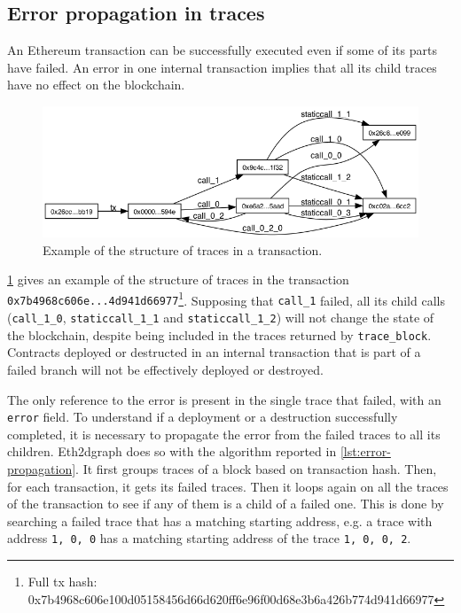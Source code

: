 \subsection{Error propagation in traces}

An Ethereum transaction can be successfully executed even if some of its parts have failed. An error in one internal transaction implies that all its child traces have no effect on the blockchain. 

\begin{figure}[!ht]
  \centering
  \includegraphics[width=1\textwidth]{Figures/methods/traces.png}
  \caption{Example of the structure of traces in a transaction.}
  \label{fig:traces}
\end{figure}

\cref{fig:traces} gives an example of the structure of traces in the transaction {\tt 0x7b4968c606e...4d941d66977}\footnote{Full tx hash: 0x7b4968c606e100d05158456d66d620ff6e96f00d68e3b6a426b774d941d66977}. Supposing that {\tt call\_1} failed, all its child calls ({\tt call\_1\_0}, {\tt staticcall\_1\_1} and {\tt staticcall\_1\_2}) will not change the state of the blockchain, despite being included in the traces returned by {\tt trace\_block}. Contracts deployed or destructed in an internal transaction that is part of a failed branch will not be effectively deployed or destroyed. 

The only reference to the error is present in the single trace that failed, with an {\tt error} field. To understand if a deployment or a destruction successfully completed, it is necessary to propagate the error from the failed traces to all its children. Eth2dgraph does so with the algorithm reported in \cref{lst:error-propagation}. It first groups traces of a block based on transaction hash. Then, for each transaction, it gets its failed traces. Then it loops again on all the traces of the transaction to see if any of them is a child of a failed one. This is done by searching a failed trace that has a matching starting address, e.g. a trace with address {\tt 1, 0, 0} has a matching starting address of the trace {\tt 1, 0, 0, 2}.

